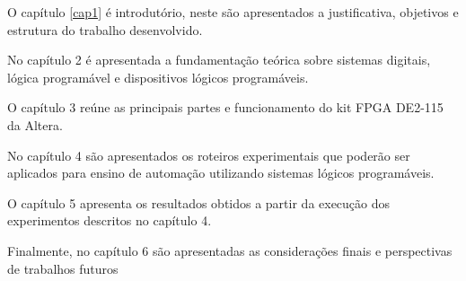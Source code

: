 O capítulo \ref{cap1} é introdutório, neste são apresentados a justificativa, objetivos e estrutura do trabalho desenvolvido.

No capítulo 2 é apresentada a fundamentação teórica sobre sistemas digitais, lógica programável e dispositivos lógicos programáveis.

O capítulo 3 reúne as principais partes e funcionamento do kit FPGA DE2-115 da Altera.

No capítulo 4 são apresentados os roteiros experimentais que poderão ser aplicados para ensino de automação utilizando sistemas lógicos programáveis.

O capítulo 5 apresenta os resultados obtidos a partir da execução dos experimentos descritos no capítulo 4.

Finalmente, no capítulo 6 são apresentadas as considerações finais e perspectivas de trabalhos futuros


